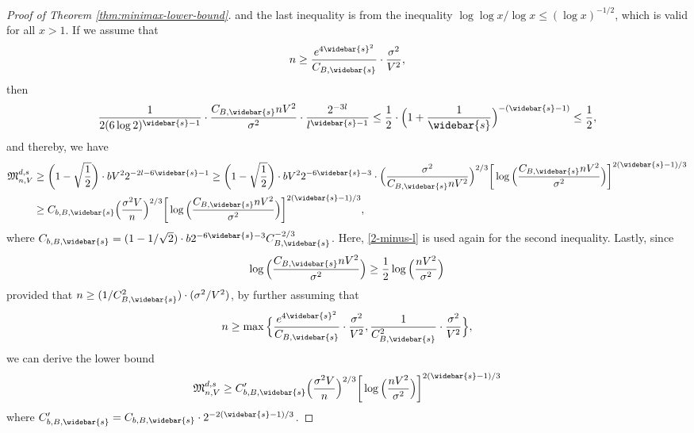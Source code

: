 \documentclass[10pt]{article}
\newcommand{\minimax}{{\mathfrak{M}^{d, s}_{n, V}}}
\begin{document}
\begin{proof}[Proof of Theorem \ref{thm:minimax-lower-bound}]
and the last inequality is from the inequality 
$\log \log x / \log x \le (\log x)^{-1/2}$, which is valid for all 
$x > 1$. If we assume that 
\begin{equation*}
    n \ge \frac{e^{4\widebar{s}^2}}{C_{B, \widebar{s}}} \cdot 
    \frac{\sigma^2}{V^2},
\end{equation*}
then 
\begin{equation*}
    \frac{1}{2(6 \log 2)^{\widebar{s} - 1}} \cdot 
    \frac{C_{B, \widebar{s}} n V^2}{\sigma^2} \cdot 
    \frac{2^{-3l}}{l^{\widebar{s} - 1}} \le 
    \frac{1}{2} \cdot \Big(1 
    + \frac{1}{\widebar{s}}\Big)^{-(\widebar{s} - 1)} 
    \le \frac{1}{2},
\end{equation*}
and thereby, we have
\begin{equation*}
\begin{aligned}
    \minimax &\ge \bigg(1 - \sqrt{\frac{1}{2}}\bigg) 
    \cdot b V^2 2^{-2l - 6\widebar{s} - 1} 
    \ge \bigg(1 - \sqrt{\frac{1}{2}}\bigg) 
    \cdot b V^2 2^{-6\widebar{s} - 3} \cdot 
    \Big(\frac{\sigma^2}{C_{B, \widebar{s}} n V^2}\Big)^{2/3}
    \bigg[\log\Big(\frac{C_{B, \widebar{s}} 
    n V^2}{\sigma^2}\Big)\bigg]^{2(\widebar{s} - 1)/3} \\
    &\ge C_{b, B, \widebar{s}}\Big(\frac{\sigma^2 V}{n}\Big)^{2/3}
    \bigg[\log\Big(\frac{C_{B, \widebar{s}} 
    n V^2}{\sigma^2}\Big)\bigg]^{2(\widebar{s} - 1)/3},
\end{aligned}
\end{equation*}
where $C_{b, B, \widebar{s}} = (1 - 1/\sqrt{2}) 
\cdot b 2^{-6\widebar{s} - 3} C_{B, \widebar{s}}^{-2/3}$.
Here, \eqref{2-minus-l} is used again for the second inequality.
Lastly, since 
\begin{equation*}
    \log\Big(\frac{C_{B, \widebar{s}} n V^2}{\sigma^2}\Big) 
    \ge \frac{1}{2} 
    \log\Big(\frac{n V^2}{\sigma^2}\Big)
\end{equation*}
provided that $n \ge (1/C_{B, \widebar{s}}^2) \cdot (\sigma^2/V^2)$, 
by further assuming that 
\begin{equation*}
    n \ge \max\Big\{\frac{e^{4\widebar{s}^2}}{C_{B, \widebar{s}}} 
    \cdot \frac{\sigma^2}{V^2}, 
    \frac{1}{C_{B, \widebar{s}}^2} \cdot \frac{\sigma^2}{V^2}\Big\},
\end{equation*}
we can derive the lower bound
\begin{equation*}
    \minimax \ge C_{b, B, \widebar{s}}'
    \Big(\frac{\sigma^2 V}{n}\Big)^{2/3}
    \bigg[\log\Big(\frac{n V^2}{\sigma^2}\Big)
    \bigg]^{2(\widebar{s} - 1)/3}
\end{equation*}
where $C_{b, B, \widebar{s}}' = C_{b, B, \widebar{s}} 
\cdot 2^{-2(\widebar{s}-1)/3}$.
\end{proof}
\end{document}
